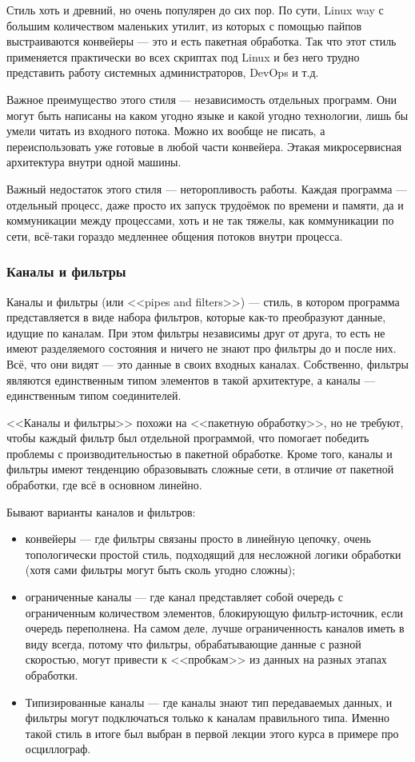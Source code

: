 \documentclass[a5paper]{article}
\begin{document}
Стиль хоть и древний, но очень популярен до сих пор. По сути, Linux way с большим количеством маленьких утилит, из которых с помощью пайпов выстраиваются конвейеры --- это и есть пакетная обработка. Так что этот стиль применяется практически во всех скриптах под Linux и без него трудно представить работу системных администраторов, DevOps и т.д.

Важное преимущество этого стиля --- независимость отдельных программ. Они могут быть написаны на каком угодно языке и какой угодно технологии, лишь бы умели читать из входного потока. Можно их вообще не писать, а переиспользовать уже готовые в любой части конвейера. Этакая микросервисная архитектура внутри одной машины.

Важный недостаток этого стиля --- неторопливость работы. Каждая программа --- отдельный процесс, даже просто их запуск трудоёмок по времени и памяти, да и коммуникации между процессами, хоть и не так тяжелы, как коммуникации по сети, всё-таки гораздо медленнее общения потоков внутри процесса.

\subsubsection{Каналы и фильтры}

Каналы и фильтры (или <<pipes and filters>>) --- стиль, в котором программа представляется в виде набора фильтров, которые как-то преобразуют данные, идущие по каналам. При этом фильтры независимы друг от друга, то есть не имеют разделяемого состояния и ничего не знают про фильтры до и после них. Всё, что они видят --- это данные в своих входных каналах. Собственно, фильтры являются единственным типом элементов в такой архитектуре, а каналы --- единственным типом соединителей.

<<Каналы и фильтры>> похожи на <<пакетную обработку>>, но не требуют, чтобы каждый фильтр был отдельной программой, что помогает победить проблемы с производительностью в пакетной обработке. Кроме того, каналы и фильтры имеют тенденцию образовывать сложные сети, в отличие от пакетной обработки, где всё в основном линейно.

Бывают варианты каналов и фильтров:

\begin{itemize}
    \item конвейеры --- где фильтры связаны просто в линейную цепочку, очень топологически простой стиль, подходящий для несложной логики обработки (хотя сами фильтры могут быть сколь угодно сложны);
    \item ограниченные каналы --- где канал представляет собой очередь с ограниченным количеством элементов, блокирующую фильтр-источник, если очередь переполнена. На самом деле, лучше ограниченность каналов иметь в виду всегда, потому что фильтры, обрабатывающие данные с разной скоростью, могут привести к <<пробкам>> из данных на разных этапах обработки.
    \item Типизированные каналы --- где каналы знают тип передаваемых данных, и фильтры могут подключаться только к каналам правильного типа. Именно такой стиль в итоге был выбран в первой лекции этого курса в примере про осциллограф.
\end{itemize}
\end{document}
